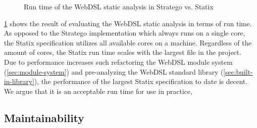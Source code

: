    \begin{figure}
      \analysisbenchmarkresults
      \caption{\label{fig:analysis-performance-charts}Run time of the WebDSL static analysis in Stratego vs. Statix}
    \end{figure}

    \cref{fig:analysis-performance-charts} shows the result of evaluating the WebDSL static analysis in terms of run time. As opposed to the Stratego implementation which always runs on a single core, the Statix specification utilizes all available cores on a machine. Regardless of the amount of cores, the Statix run time scales with the largest file in the project. Due to performance increases such refactoring the WebDSL module system (\cref{sec:module-system}) and pre-analyzing the WebDSL standard library (\cref{sec:built-in-library}), the performance of the largest Statix specification to date is decent. We argue that it is an acceptable run time for use in practice, 

  \subsection{Maintainability}


